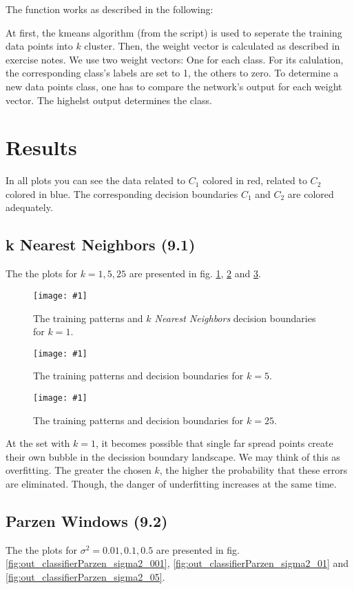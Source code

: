 \documentclass[a4paper,headings=small]{scrartcl}
\newcommand{\image}[3]{
\begin{figure}[htbp]
\centering
\texttt{[image: \#1]}
\caption{#3}
\label{fig:#1}
\end{figure}
}
\begin{document}
The function works as described in the following:

At first, the kmeans algorithm (from the script) is used to seperate the training data points into $k$ cluster.
Then, the weight vector is calculated as described in exercise notes.
We use two weight vectors:
One for each class. For its calulation, the corresponding class's labels are set to 1, the others to zero.
To determine a new data points class, one has to compare the network's output for each weight vector.
The highelst output determines the class.


\section{Results}

\newcommand{\classifierPlotWidth}[0]{0.85}

In all plots you can see the data related to $C_1$ colored in red, related to $C_2$ colored in blue.
The corresponding decision boundaries $C_1$ and $C_2$ are colored adequately.


\subsection{k Nearest Neighbors (9.1)}
The the plots for $k = 1, 5, 25$ are presented in fig.
\ref{fig:out_classifierKnn_k_1},
\ref{fig:out_classifierKnn_k_5} and
\ref{fig:out_classifierKnn_k_25}.

\image{out_classifierKnn_k_1}{\classifierPlotWidth}%
	{The training patterns and \emph{$k$ Nearest Neighbors} decision boundaries for $k = 1$.}

\image{out_classifierKnn_k_5}{\classifierPlotWidth}%
	{The training patterns and decision boundaries for $k = 5$.}

\image{out_classifierKnn_k_25}{\classifierPlotWidth}%
	{The training patterns and decision boundaries for $k = 25$.}

At the set with $k = 1$, it becomes possible that single far spread points
create their own bubble in the decission boundary landscape.
We may think of this as overfitting.
The greater the chosen $k$, the higher the probability that these errors are eliminated.
Though, the danger of underfitting increases at the same time.


\subsection{Parzen Windows (9.2)}
The the plots for $\sigma^2 = 0.01, 0.1, 0.5$ are presented in fig.
\ref{fig:out_classifierParzen_sigma2_001},
\ref{fig:out_classifierParzen_sigma2_01} and
\ref{fig:out_classifierParzen_sigma2_05}.
\end{document}
